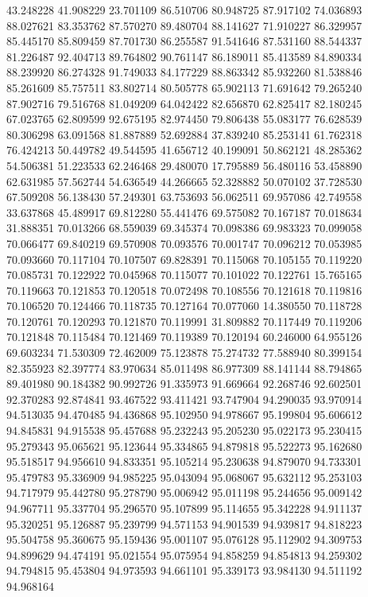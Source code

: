 43.248228
41.908229
23.701109
86.510706
80.948725
87.917102
74.036893
88.027621
83.353762
87.570270
89.480704
88.141627
71.910227
86.329957
85.445170
85.809459
87.701730
86.255587
91.541646
87.531160
88.544337
81.226487
92.404713
89.764802
90.761147
86.189011
85.413589
84.890334
88.239920
86.274328
91.749033
84.177229
88.863342
85.932260
81.538846
85.261609
85.757511
83.802714
80.505778
65.902113
71.691642
79.265240
87.902716
79.516768
81.049209
64.042422
82.656870
62.825417
82.180245
67.023765
62.809599
92.675195
82.974450
79.806438
55.083177
76.628539
80.306298
63.091568
81.887889
52.692884
37.839240
85.253141
61.762318
76.424213
50.449782
49.544595
41.656712
40.199091
50.862121
48.285362
54.506381
51.223533
62.246468
29.480070
17.795889
56.480116
53.458890
62.631985
57.562744
54.636549
44.266665
52.328882
50.070102
37.728530
67.509208
56.138430
57.249301
63.753693
56.062511
69.957086
42.749558
33.637868
45.489917
69.812280
55.441476
69.575082
70.167187
70.018634
31.888351
70.013266
68.559039
69.345374
70.098386
69.983323
70.099058
70.066477
69.840219
69.570908
70.093576
70.001747
70.096212
70.053985
70.093660
70.117104
70.107507
69.828391
70.115068
70.105155
70.119220
70.085731
70.122922
70.045968
70.115077
70.101022
70.122761
15.765165
70.119663
70.121853
70.120518
70.072498
70.108556
70.121618
70.119816
70.106520
70.124466
70.118735
70.127164
70.077060
14.380550
70.118728
70.120761
70.120293
70.121870
70.119991
31.809882
70.117449
70.119206
70.121848
70.115484
70.121469
70.119389
70.120194
60.246000
64.955126
69.603234
71.530309
72.462009
75.123878
75.274732
77.588940
80.399154
82.355923
82.397774
83.970634
85.011498
86.977309
88.141144
88.794865
89.401980
90.184382
90.992726
91.335973
91.669664
92.268746
92.602501
92.370283
92.874841
93.467522
93.411421
93.747904
94.290035
93.970914
94.513035
94.470485
94.436868
95.102950
94.978667
95.199804
95.606612
94.845831
94.915538
95.457688
95.232243
95.205230
95.022173
95.230415
95.279343
95.065621
95.123644
95.334865
94.879818
95.522273
95.162680
95.518517
94.956610
94.833351
95.105214
95.230638
94.879070
94.733301
95.479783
95.336909
94.985225
95.043094
95.068067
95.632112
95.253103
94.717979
95.442780
95.278790
95.006942
95.011198
95.244656
95.009142
94.967711
95.337704
95.296570
95.107899
95.114655
95.342228
94.911137
95.320251
95.126887
95.239799
94.571153
94.901539
94.939817
94.818223
95.504758
95.360675
95.159436
95.001107
95.076128
95.112902
94.309753
94.899629
94.474191
95.021554
95.075954
94.858259
94.854813
94.259302
94.794815
95.453804
94.973593
94.661101
95.339173
93.984130
94.511192
94.968164
